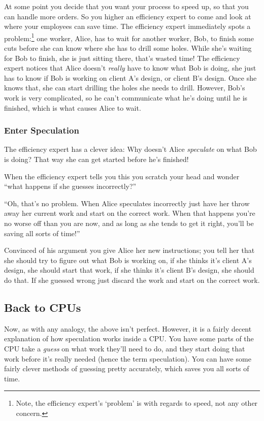 \documentclass{article}
\begin{document}
At some point you decide that you want your process to speed up, so that you
can handle more orders. So you higher an efficiency expert to come and look at
where your employees can save time. The efficiency expert immediately spots a
problem:\footnote{Note, the efficiency expert's `problem' is with regards to
speed, not any other concern.} one worker, Alice, has to wait for another
worker, Bob, to finish some cuts before she can know where she has to drill
some holes. While she's waiting for Bob to finish, she is just sitting there,
that's wasted time!  The efficiency expert notices that Alice doesn't
\emph{really} have to know what Bob is doing, she just has to know if Bob is
working on client A's design, or client B's design. Once she knows that, she
can start drilling the holes she needs to drill. However, Bob's work is very
complicated, so he can't communicate what he's doing until he is finished,
which is what causes Alice to wait.

\subsubsection*{Enter Speculation}

The efficiency expert has a clever idea: Why doesn't Alice \emph{speculate}
on what Bob is doing? That way she can get started before he's finished!

When the efficiency expert tells you this you scratch your head and wonder
``what happens if she guesses incorrectly?''

``Oh, that's no problem. When Alice speculates incorrectly just have her throw
away her current work and start on the correct work. When that happens you're
no worse off than you are now, and as long as she tends to get it right, you'll
be saving all sorts of time!''

Convinced of his argument you give Alice her new instructions; you tell her
that she should try to figure out what Bob is working on, if she thinks it's
client A's design, she should start that work, if she thinks it's client B's
design, she should do that. If she guessed wrong just discard the work and
start on the correct work.


\subsection*{Back to CPUs}

Now, as with any analogy, the above isn't perfect. However, it is a fairly
decent explanation of how speculation works inside a CPU. You have some parts
of the CPU take a \emph{guess} on what work they'll need to do, and they start
doing that work before it's really needed (hence the term speculation). You can
have some fairly clever methods of guessing pretty accurately, which saves you
all sorts of time.
\end{document}
